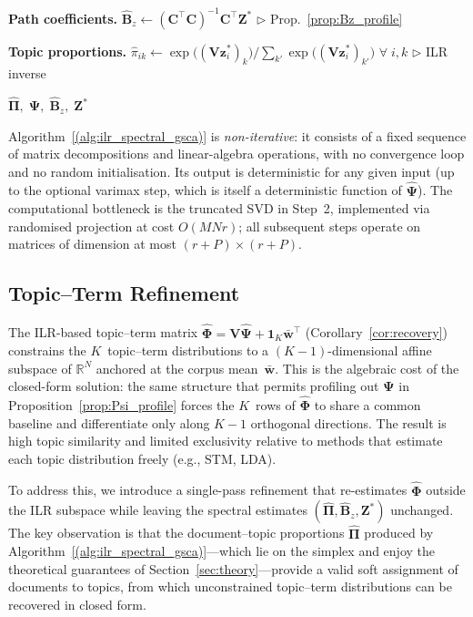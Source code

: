 \begin{algorithm}[h]
\begin{algorithmic}[1]
\STATE \textbf{Path coefficients.}\;
  $\hat{\mathbf{B}}_z \leftarrow
    (\mathbf{C}^{\!\top}\mathbf{C})^{-1}
    \mathbf{C}^{\!\top}\mathbf{Z}^*$
  \hfill$\triangleright$ Prop.~\ref{prop:Bz_profile}

\STATE \textbf{Topic proportions.}\;
  $\hat{\pi}_{ik} \leftarrow
    \exp\!\bigl((\mathbf{V}\mathbf{z}_i^*)_k\bigr)\big/
    \sum_{k'}\exp\!\bigl((\mathbf{V}\mathbf{z}_i^*)_{k'}\bigr)$
  \quad$\forall\; i,k$
  \hfill$\triangleright$ ILR inverse

\RETURN $\hat{\boldsymbol{\Pi}},\;
  \hat{\boldsymbol{\Psi}},\;
  \hat{\mathbf{B}}_z,\;
  \mathbf{Z}^*$
\end{algorithmic}
\end{algorithm}

\noindent
Algorithm~\ref{(alg:ilr_spectral_gsca)} is \emph{non-iterative}: it consists
of a fixed sequence of matrix decompositions and linear-algebra
operations, with no convergence loop and no random initialisation.
Its output is deterministic for any given input (up to the optional
varimax step, which is itself a deterministic function of
$\hat{\boldsymbol{\Psi}}$). The computational bottleneck is the
truncated SVD in Step~2, implemented via randomised projection
\citep{halko2011finding} at cost $O(MNr)$; all subsequent steps
operate on matrices of dimension at most
$(r{+}P)\times(r{+}P)$.


\subsection{Topic--Term Refinement}
\label{subsec:refinement}

The ILR-based topic--term matrix
$\hat{\boldsymbol{\Phi}} = \mathbf{V}\hat{\boldsymbol{\Psi}}
+ \mathbf{1}_K\bar{\mathbf{w}}^{\!\top}$
(Corollary~\ref{cor:recovery}) constrains the $K$~topic--term
distributions to a $(K{-}1)$-dimensional affine subspace of
$\mathbb{R}^N$ anchored at the corpus mean~$\bar{\mathbf{w}}$.
This is the algebraic cost of the closed-form solution: the same
structure that permits profiling out $\boldsymbol{\Psi}$ in
Proposition~\ref{prop:Psi_profile} forces the $K$~rows of
$\hat{\boldsymbol{\Phi}}$ to share a common baseline and
differentiate only along $K{-}1$ orthogonal directions. The result is
high topic similarity and limited exclusivity relative to methods
that estimate each topic distribution freely (e.g., STM, LDA).

To address this, we introduce a single-pass refinement that
re-estimates $\hat{\boldsymbol{\Phi}}$ outside the ILR subspace
while leaving the spectral estimates
$(\hat{\boldsymbol{\Pi}}, \hat{\mathbf{B}}_z, \mathbf{Z}^*)$
unchanged. The key observation is that the document--topic
proportions $\hat{\boldsymbol{\Pi}}$ produced by
Algorithm~\ref{(alg:ilr_spectral_gsca)}---which lie on the simplex and enjoy
the theoretical guarantees of
Section~\ref{sec:theory}---provide a valid soft assignment of
documents to topics, from which unconstrained topic--term
distributions can be recovered in closed form.

